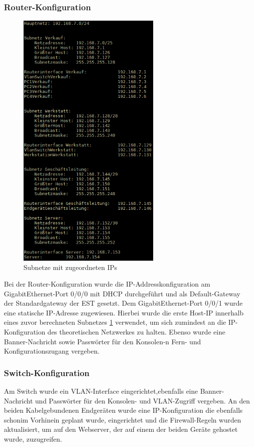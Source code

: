 \subsubsection{Router-Konfiguration}

\begin{figure}[H]
	\centering
	\includegraphics[width=7cm]{images/IPAdressen.png}
	\caption[Subnetze]{Subnetze mit zugeordneten IPs}
	\label{fig:subnetze}
\end{figure}

Bei der Router-Konfiguration wurde die IP-Addresskonfiguration am GigabitEthernet-Port 0/0/0 mit DHCP durchgeführt und als Default-Gateway der Standardgateway der EST gesetzt. Dem 
GigabitEthernet-Port 0/0/1 wurde eine statische IP-Adresse zugewiesen. Hierbei wurde die erste Host-IP innerhalb eines zuvor berechneten Subnetzes \ref{fig:subnetze} verwendet, um sich 
zumindest an die IP-Konfiguration des theoretischen Netzwerkes zu halten. Ebenso wurde eine Banner-Nachricht sowie Passwörter für den Konsolen-n Fern- und Konfigurationszugang 
vergeben. 

\subsubsection{Switch-Konfiguration}
Am Switch wurde ein VLAN-Interface eingerichtet,ebenfalls eine Banner-Nachricht und Passwörter für den Konsolen- und VLAN-Zugriff vergeben. An den beiden Kabelgebundenen Endgeräten 
wurde eine IP-Konfiguration die ebenfalls schonim Vorhinein geplant wurde, eingerichtet und die Firewall-Regeln wurden aktualisiert, um auf den Webserver, der auf einem der beiden 
Geräte gehostet wurde, zuzugreifen. 

